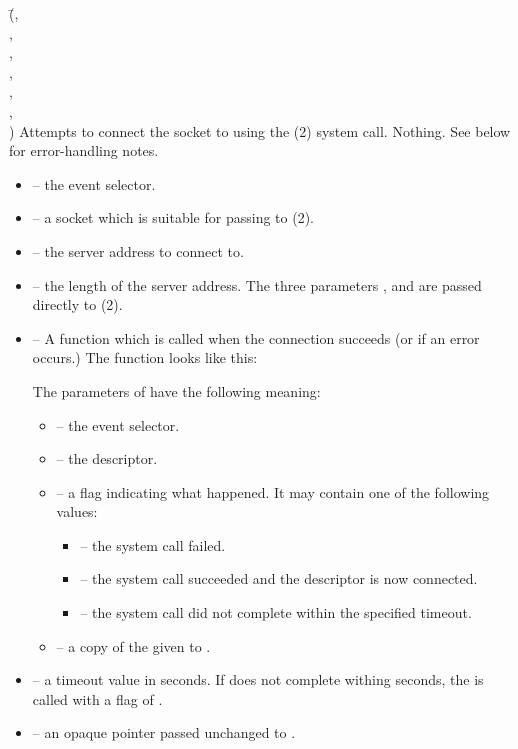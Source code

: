 \documentclass{article}
\begin{document}
{(\=,\\
  \> ,\\
  \>,\\
  \> ,\\
  \> ,\\
  \> ,\\
  \>)}
{Attempts to connect the socket  to  using the
  (2) system call.}
{Nothing.  See below for error-handling notes.}
\begin{itemize}
\item {} -- the event selector.
\item {} -- a socket which is suitable for passing to
  (2).
\item {} -- the server address to connect to.
\item {} -- the length of the server address.  The
  three parameters ,  and  are passed
  directly to (2).
\item {} -- A function which is called when the connection succeeds
  (or if an error occurs.)  The function  looks like this:

   

  The parameters of  have the following meaning:
  \begin{itemize}
  \item {} -- the event selector.
  \item {} -- the descriptor.
  \item {} -- a flag indicating what happened.  It may contain
    one of the following values:
    \begin{itemize}
    \item {} -- the  system call
      failed.
    \item {} -- the  system
      call succeeded and the descriptor is now connected.
    \item {} -- the  system call
      did not complete within the specified timeout.
    \end{itemize}
  \item {} -- a copy of the  given to
    .
  \end{itemize}
\item {} -- a timeout value in seconds.  If  does
  not complete withing  seconds, the  is called
  with a flag of .
\item {} -- an opaque pointer passed unchanged to .
\end{itemize}
\end{document}
